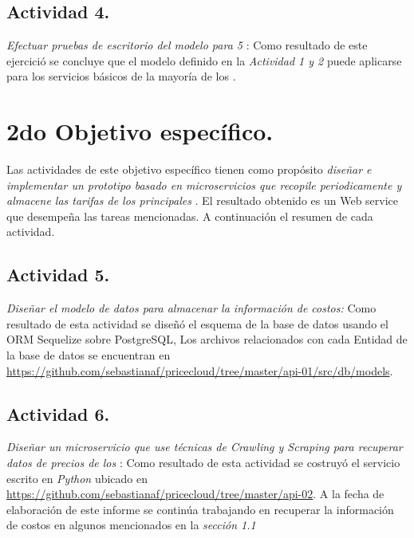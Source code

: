 \subsection{Actividad 4.}
\emph{Efectuar pruebas de escritorio del modelo para 5 }:
\newline\newline
Como resultado de este ejercició se concluye que el modelo definido en la \emph{Actividad 1 y 2} puede aplicarse para los servicios básicos de la mayoría de los .

\section{2do Objetivo específico.}
Las actividades de este objetivo específico tienen como propósito \emph{diseñar e implementar un prototipo basado en microservicios que recopile periodicamente y almacene las tarifas de los principales }. El resultado obtenido es un Web service que desempeña las tareas mencionadas. A continuación el resumen de cada actividad.

\subsection{Actividad 5.}
\emph{Diseñar el modelo de datos para almacenar la información de costos:}
\newline\newline
Como resultado de esta actividad se diseñó el esquema de la base de datos usando el \acrshort{ORM} \gls{Sequelize} sobre \gls{PostgreSQL}, Los archivos relacionados con cada Entidad de la base de datos se encuentran en \url{https://github.com/sebastianaf/pricecloud/tree/master/api-01/src/db/models}.

\subsection{Actividad 6.}
\emph{Diseñar un microservicio que use técnicas de \emph{Crawling} y \emph{Scraping} para recuperar datos de precios de los }:
\newline\newline
Como resultado de esta actividad se costruyó el servicio escrito en \emph{Python} ubicado en \url{https://github.com/sebastianaf/pricecloud/tree/master/api-02}. A la fecha de elaboración de este informe se continúa trabajando en recuperar la información de costos en algunos  mencionados en la \emph{sección 1.1}

